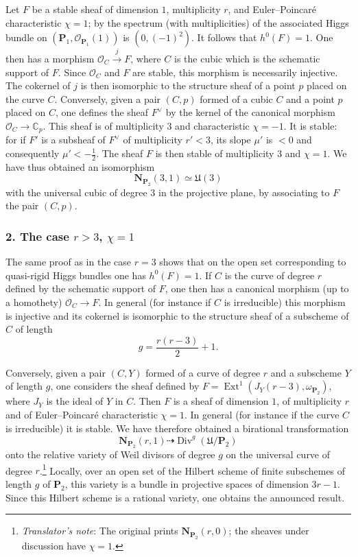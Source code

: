\documentclass[12pt,english]{smfart}%
\theoremstyle{plain}
\theoremstyle{definition}
\theoremstyle{remark}
\newcommand{\PP}{\mathbf{P}}
\newcommand{\NN}{\mathbf{N}}           %
\newcommand{\CC}{\mathbb{C}}
\newcommand{\Oo}{\mathcal{O}}
\DeclareMathOperator{\Ext}{Ext}
\DeclareMathOperator{\Div}{Div}
\newcommand{\origpage}[1]{\marginnote{\scriptsize\itshape p.~#1}}
\newcommand{\tnote}[1]{\footnote{\emph{Translator's note}: #1}}
\begin{document}
Let $F$ be a stable sheaf of dimension $1$, multiplicity $r$, and Euler--Poincar\'e characteristic $\chi=1$; by  the spectrum (with multiplicities) of the associated Higgs bundle on $(\PP_1,\Oo_{\PP_1}(1))$ is $(0,(-1)^2)$. It follows that $h^0(F)=1$. One then has a morphism $\Oo_C\xrightarrow{\;j\;}F$, where $C$ is the cubic which is the schematic support of $F$. Since $\Oo_C$ and $F$ are stable, this morphism is necessarily injective. The cokernel of $j$ is then isomorphic to the structure sheaf of a point $p$ placed on the curve $C$. Conversely, given a pair $(C,p)$ formed of a cubic $C$ and a point $p$ placed on $C$, one defines the sheaf $F^{\vee}$ by the kernel of the canonical morphism $\Oo_C\to \CC_p$. This sheaf is of multiplicity $3$ and characteristic $\chi=-1$. It is stable: for if $F'$ is a subsheaf of $F^{\vee}$ of multiplicity $r'<3$, its slope $\mu'$ is $<0$ and consequently $\mu'<-\tfrac12$. The sheaf $F$ is then stable of multiplicity $3$ and $\chi=1$. We have thus obtained an isomorphism
\[
\NN_{\PP_2}(3,1)\simeq \mathfrak{U}(3)
\]
with the universal cubic of degree $3$ in the projective plane, by associating to $F$ the pair $(C,p)$.

\subsubsection*{2. The case $r>3$, $\chi=1$}

The same proof as in the case $r=3$ shows that on the open set corresponding to quasi-rigid Higgs bundles one has $h^0(F)=1$. If $C$ is the curve of degree $r$ defined by the schematic support of $F$, one then has a canonical morphism (up to a homothety) $\Oo_C\to F$. In general (for instance if $C$ is irreducible) this morphism is injective and its cokernel is isomorphic to the structure sheaf of a subscheme of $C$ of length
\[
g = \frac{r(r-3)}{2}+1 .
\]

Conversely, given a pair $(C,Y)$ formed of a curve of degree $r$ and a subscheme $Y$ of length $g$, one considers the sheaf defined by $F = \Ext^1(J_Y(r-3),\omega_{\PP_2})$, where $J_Y$ is the ideal of $Y$ in $C$. Then $F$ is a sheaf of dimension $1$, of multiplicity $r$ and of Euler--Poincar\'e characteristic $\chi=1$. In general (for instance if the curve $C$ is irreducible) it is stable. We have therefore obtained a birational transformation
\[
\NN_{\PP_2}(r,1)\dashrightarrow \Div^g(\mathfrak{U}/\PP_2)
\]
onto the relative variety of Weil divisors of degree $g$ on the universal curve of degree $r$.\tnote{The original prints $\NN_{\PP_2}(r,0)$; the sheaves under discussion have $\chi=1$.} Locally, over an open set of the Hilbert scheme of finite subschemes of length $g$ of $\PP_2$, this variety is a bundle in projective
\origpage{672}%
spaces of dimension $3r-1$. Since this Hilbert scheme is a rational variety, one obtains the announced result.
\end{document}
